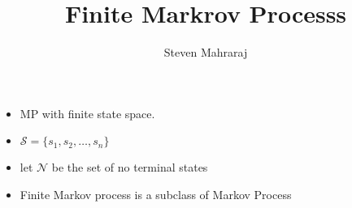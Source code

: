 \documentclass[10pt,a4paper]{article}
\begin{document}
\title{Finite Markrov Processs}
\author{Steven Mahraraj}
\maketitle
\begin{itemize}
    \item MP with finite state space.
    \item $\mathcal{S} = \{s_1,s_2,\dots,s_n\}$
    \item let $\mathcal{N}$ be the set of no terminal states
\end{itemize}
\begin{itemize}
    \item Finite Markov process is a subclass of Markov Process
\end{itemize}
\end{document}
